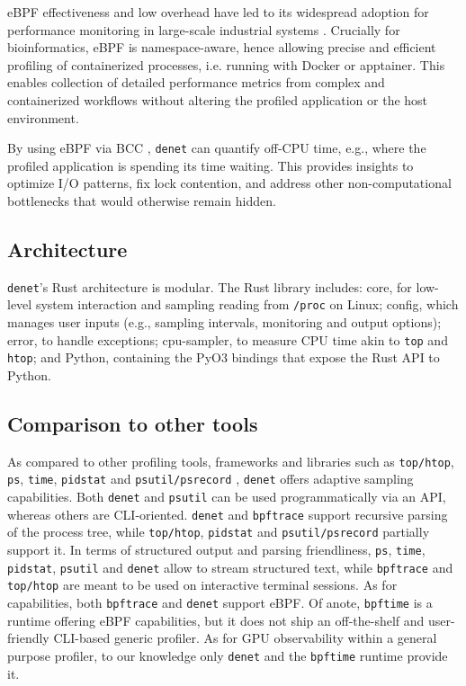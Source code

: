 \documentclass[10pt]{article}
\begin{document}
eBPF effectiveness and low overhead have led to its widespread adoption for performance monitoring in large-scale industrial systems \cite{benson2024netedit}. Crucially for bioinformatics, eBPF is namespace-aware, hence allowing precise and efficient profiling of containerized processes, i.e. running with Docker or apptainer. This enables collection of detailed performance metrics from complex and containerized workflows without altering the profiled application or the host environment.

By using eBPF via BCC \cite{bcc}, \texttt{denet} can quantify off-CPU time, e.g., where the profiled application is spending its time waiting. This provides insights to optimize I/O patterns, fix lock contention, and address other non-computational bottlenecks that would otherwise remain hidden.

\subsection*{Architecture}

\texttt{denet}'s Rust architecture is modular. The Rust library includes: core, for low-level system interaction and sampling reading from \texttt{/proc} on Linux; config, which manages user inputs (e.g., sampling intervals, monitoring and output options); error, to handle exceptions; cpu-sampler, to measure CPU time akin to \texttt{top} and \texttt{htop}; and Python, containing the PyO3 bindings that expose the Rust API to Python.

\subsection*{Comparison to other tools}

As compared to other profiling tools, frameworks and libraries such as \texttt{top/htop}, \texttt{ps}, \texttt{time}, \texttt{pidstat} and \texttt{psutil/psrecord} \cite{psrecord},  \texttt{denet} offers adaptive sampling capabilities. Both \texttt{denet} and \texttt{psutil} \cite{rodola2020psutil} can be used programmatically via an API, whereas others are CLI-oriented. \texttt{denet} and \texttt{bpftrace} \cite{bpftrace} support recursive parsing of the process tree, while \texttt{top/htop}, \texttt{pidstat} and \texttt{psutil/psrecord} partially support it. In terms of structured output and parsing friendliness, \texttt{ps}, \texttt{time}, \texttt{pidstat}, \texttt{psutil} and \texttt{denet} allow to stream structured text, while \texttt{bpftrace} and \texttt{top/htop} are meant to be used on interactive terminal sessions. As for capabilities, both \texttt{bpftrace} and \texttt{denet} support eBPF. Of anote, \texttt{bpftime} is a runtime offering eBPF capabilities, but it does not ship an off-the-shelf and user-friendly CLI-based generic profiler. As for GPU observability within a general purpose profiler, to our knowledge only \texttt{denet} and the \texttt{bpftime} \cite{zheng2025extendingbpftime} runtime provide it.
\end{document}
